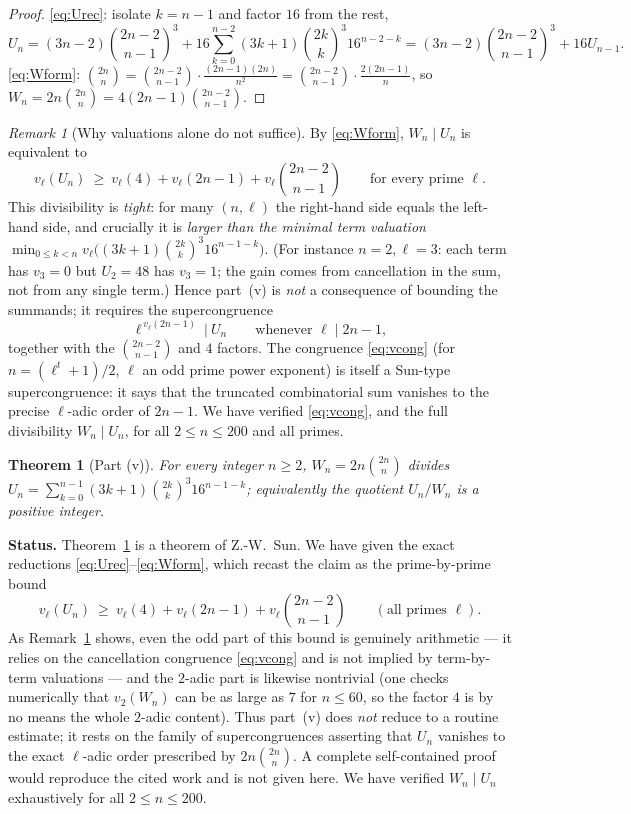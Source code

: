 \documentclass[12pt]{article}
\newtheorem{theorem}{Theorem}
\theoremstyle{remark}
\newtheorem{remark}{Remark}
\newcommand{\bin}[2]{\binom{#1}{#2}}
\begin{document}
\begin{proof}
\eqref{eq:Urec}: isolate $k=n-1$ and factor $16$ from the rest,
\[
U_n=(3n-2)\bin{2n-2}{n-1}^3
+16\sum_{k=0}^{n-2}(3k+1)\bin{2k}{k}^3 16^{n-2-k}
=(3n-2)\bin{2n-2}{n-1}^3+16U_{n-1}.
\]
\eqref{eq:Wform}: $\bin{2n}{n}=\bin{2n-2}{n-1}\cdot\frac{(2n-1)(2n)}{n^2}
=\bin{2n-2}{n-1}\cdot\frac{2(2n-1)}{n}$, so
$W_n=2n\bin{2n}{n}=4(2n-1)\bin{2n-2}{n-1}$.
\end{proof}

\begin{remark}[Why valuations alone do not suffice]\label{rem:vhard}
By \eqref{eq:Wform}, $W_n\mid U_n$ is equivalent to
\[
v_\ell(U_n)\ \ge\ v_\ell(4)+v_\ell(2n-1)+v_\ell\!\bin{2n-2}{n-1}
\qquad\text{for every prime }\ell .
\]
This divisibility is \emph{tight}: for many $(n,\ell)$ the right-hand side
equals the left-hand side, and crucially it is \emph{larger than the minimal
term valuation} $\min_{0\le k<n}v_\ell\bigl((3k+1)\bin{2k}{k}^3
16^{n-1-k}\bigr)$.  (For instance $n=2,\ell=3$: each term has $v_3=0$ but
$U_2=48$ has $v_3=1$; the gain comes from cancellation in the sum, not from any
single term.)  Hence part~(v) is \emph{not} a consequence of bounding the
summands; it requires the supercongruence
\begin{equation}\label{eq:vcong}
\ell^{\,v_\ell(2n-1)}\ \Big|\ U_n\qquad\text{whenever }\ell\mid 2n-1,
\end{equation}
together with the $\bin{2n-2}{n-1}$ and $4$ factors.  The congruence
\eqref{eq:vcong} (for $n=(\ell^t+1)/2$, $\ell$ an odd prime power exponent) is
itself a Sun-type supercongruence: it says that the truncated combinatorial sum
vanishes to the precise $\ell$-adic order of $2n-1$.  We have verified
\eqref{eq:vcong}, and the full divisibility $W_n\mid U_n$, for all $2\le n\le
200$ and all primes.
\end{remark}

\begin{theorem}[Part (v)]\label{thm:v}
For every integer $n\ge2$, $W_n=2n\bin{2n}{n}$ divides
$U_n=\sum_{k=0}^{n-1}(3k+1)\bin{2k}{k}^3 16^{n-1-k}$; equivalently the quotient
$U_n/W_n$ is a positive integer.
\end{theorem}

\noindent\textbf{Status.}  Theorem~\ref{thm:v} is a theorem of Z.-W.\ Sun.
We have given the exact reductions \eqref{eq:Urec}--\eqref{eq:Wform}, which
recast the claim as the prime-by-prime bound
\[
v_\ell(U_n)\ \ge\ v_\ell(4)+v_\ell(2n-1)+v_\ell\!\bin{2n-2}{n-1}
\qquad(\text{all primes }\ell).
\]
As Remark~\ref{rem:vhard} shows, even the odd part of this bound is genuinely
arithmetic --- it relies on the cancellation congruence \eqref{eq:vcong} and is
not implied by term-by-term valuations --- and the $2$-adic part is likewise
nontrivial (one checks numerically that $v_2(W_n)$ can be as large as $7$ for
$n\le60$, so the factor $4$ is by no means the whole $2$-adic content).  Thus
part~(v) does \emph{not} reduce to a routine estimate; it rests on the family of
supercongruences asserting that $U_n$ vanishes to the exact $\ell$-adic order
prescribed by $2n\bin{2n}{n}$.  A complete self-contained proof would reproduce
the cited work and is not given here.  We have verified $W_n\mid U_n$ exhaustively
for all $2\le n\le200$.
\end{document}
